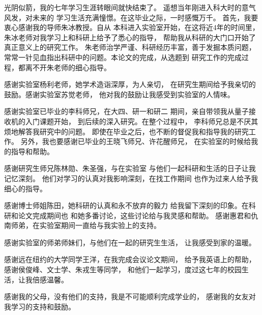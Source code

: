 \begin{acknowledgements}
光阴似箭，我的七年学习生涯转眼间就快结束了。
遥想当年刚进入科大时的意气风发，对未来的
学习生活充满憧憬。在这毕业之际，一时感慨万千。
首先，我要衷心感谢我的导师朱冰教授。自从
本科进入实验室开始，在这将近4年的时间里，
朱冰老师对我学习上和科研上给予了悉心的指导，
帮助我从科研的大门口开始了真正意义上的研究工作。
朱老师治学严谨、科研经历丰富，善于发掘本质问题，
常常一针见血指出科研中的问题。本论文的完成，从选题到
研究工作的完成过程，都离不开朱老师的细心指导。

感谢实验室杨利老师，她学术造诣深厚，为人亲切，
在研究生期间给予我亲切的鼓励。感谢实验室苏觉老师，
他对我的鼓励让我感受到实验室的人情味。

感谢实验室已毕业的李科师兄，在大四、研一和研二
期间，亲自带领我从量子接收机的入门课题开始，
到后续的深入研究。在整个过程中，
李科师兄总是不厌其烦地解答我研究中的问题。
即使在毕业之后，也不断的督促我和指导我的研究工作。
另外，我也要感谢已毕业的王晓飞师兄、许花醒师兄，
在实验室的时候给我的指导和帮助。

感谢研究生师兄陈林勋、朱圣强，与在实验室
与他们一起科研和生活的日子让我记忆深刻。
他们对学习的认真对我影响深刻，在找工作期间
也作为过来人给予我细心的指导。

感谢博士师姐陈田，她科研的认真和永不放弃的毅力
给我留下深刻的印象。在科研和论文完成期间也
和她多番讨论，这些讨论给与我灵感和帮助。
感谢惠君和仇南师弟，在实验室期间一直给与我实验上的支持。

感谢实验室的师弟师妹们，与他们在一起的研究生生活，
让我感受到家的温暖。

感谢远在纽约的大学同学王洋，在我完成会议论文期间，
给予我英语上的帮助，感谢侯俊峰、文士学、朱戎生等同学，
和他们一起学习，度过这七年的校园生活，让我倍感温馨。

感谢我的父母，没有他们的支持，我是不可能顺利完成学业的，
感谢我的女友对我学习的支持和鼓励。


\end{acknowledgements}
